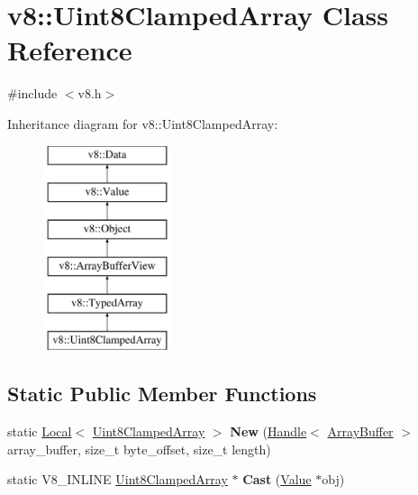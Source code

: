 \hypertarget{classv8_1_1Uint8ClampedArray}{}\section{v8\+:\+:Uint8\+Clamped\+Array Class Reference}
\label{classv8_1_1Uint8ClampedArray}


{\ttfamily \#include $<$v8.\+h$>$}

Inheritance diagram for v8\+:\+:Uint8\+Clamped\+Array\+:\begin{figure}[H]
\begin{center}
\leavevmode
\includegraphics[height=6.000000cm]{classv8_1_1Uint8ClampedArray}
\end{center}
\end{figure}
\subsection*{Static Public Member Functions}
\begin{DoxyCompactItemize}
\item 
\hypertarget{classv8_1_1Uint8ClampedArray_ac1979cc1d0591a35e412a0fde9572667}{}static \hyperlink{classv8_1_1Local}{Local}$<$ \hyperlink{classv8_1_1Uint8ClampedArray}{Uint8\+Clamped\+Array} $>$ {\bfseries New} (\hyperlink{classv8_1_1Handle}{Handle}$<$ \hyperlink{classv8_1_1ArrayBuffer}{Array\+Buffer} $>$ array\+\_\+buffer, size\+\_\+t byte\+\_\+offset, size\+\_\+t length)\label{classv8_1_1Uint8ClampedArray_ac1979cc1d0591a35e412a0fde9572667}

\item 
\hypertarget{classv8_1_1Uint8ClampedArray_aa1358e0ac24e305af5c90ba71b73fa7c}{}static V8\+\_\+\+I\+N\+L\+I\+N\+E \hyperlink{classv8_1_1Uint8ClampedArray}{Uint8\+Clamped\+Array} $\ast$ {\bfseries Cast} (\hyperlink{classv8_1_1Value}{Value} $\ast$obj)\label{classv8_1_1Uint8ClampedArray_aa1358e0ac24e305af5c90ba71b73fa7c}

\end{DoxyCompactItemize}
